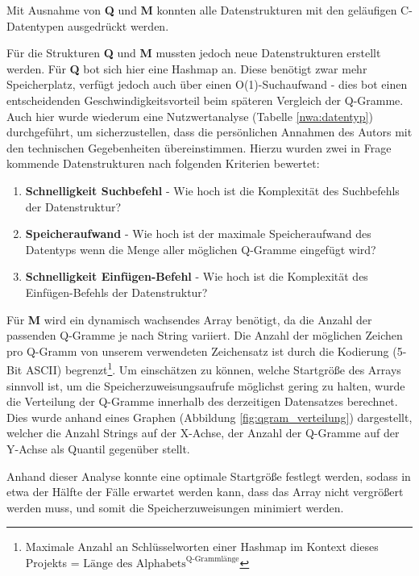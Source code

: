Mit Ausnahme von \textbf{Q} und \textbf{M} konnten  alle Datenstrukturen mit den geläufigen C-Datentypen ausgedrückt werden.

Für die Strukturen \textbf{Q} und \textbf{M} mussten jedoch neue Datenstrukturen
erstellt werden. Für \textbf{Q} bot sich hier eine Hashmap an. Diese benötigt zwar mehr Speicherplatz, verfügt jedoch auch über einen O(1)-Suchaufwand - dies bot einen entscheidenden Geschwindigkeitsvorteil beim späteren Vergleich der Q-Gramme.
Auch hier wurde wiederum eine Nutzwertanalyse (Tabelle \ref{nwa:datentyp}) durchgeführt,
um sicherzustellen, dass die persönlichen Annahmen des Autors mit den technischen
Gegebenheiten übereinstimmen.
Hierzu wurden zwei in Frage kommende Datenstrukturen nach folgenden Kriterien bewertet:

\begin{enumerate}
	\item \textbf{Schnelligkeit Suchbefehl} - Wie hoch ist die Komplexität des Suchbefehls der Datenstruktur?
    \item \textbf{Speicheraufwand} - Wie hoch ist der maximale Speicheraufwand des Datentyps wenn die Menge aller möglichen Q-Gramme eingefügt wird?
    \item \textbf{Schnelligkeit Einfügen-Befehl} - Wie hoch ist die Komplexität des Einfügen-Befehls der Datenstruktur?\\

\end{enumerate}

Für \textbf{M} wird ein dynamisch wachsendes Array benötigt, da die Anzahl der passenden
Q-Gramme je nach String variiert. Die Anzahl der möglichen Zeichen pro Q-Gramm von unserem verwendeten Zeichensatz ist durch die Kodierung (5-Bit ASCII) begrenzt\footnote{Maximale Anzahl an Schlüsselworten einer Hashmap im Kontext dieses Projekts = $\text{Länge des Alphabets}^\text{Q-Grammlänge}$ }. Um einschätzen zu können, welche Startgröße des Arrays sinnvoll ist, um die Speicherzuweisungsaufrufe möglichst gering zu halten, wurde die Verteilung der Q-Gramme innerhalb des derzeitigen Datensatzes berechnet. Dies wurde anhand eines
Graphen (Abbildung \ref{fig:qgram_verteilung}) dargestellt, welcher die Anzahl Strings auf der X-Achse, der Anzahl der Q-Gramme auf der Y-Achse als Quantil gegenüber stellt.

Anhand dieser Analyse konnte eine optimale Startgröße festlegt werden, sodass in etwa der Hälfte der Fälle
erwartet werden kann, dass das Array nicht vergrößert werden muss, und somit die
Speicherzuweisungen minimiert werden.


